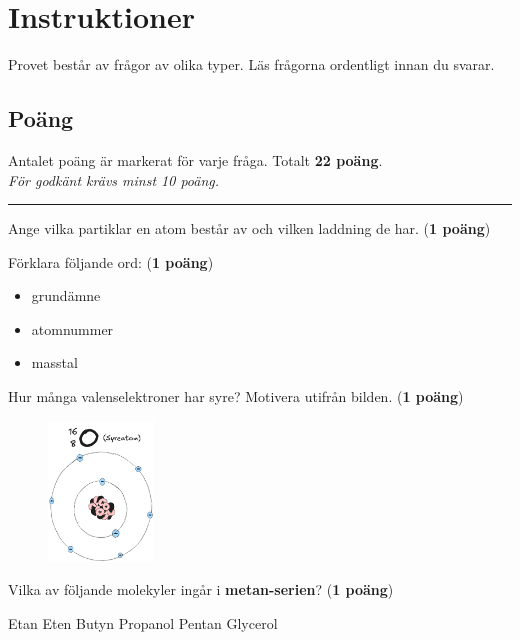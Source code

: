 \documentclass[12pt]{exam}
\begin{document}
\section*{Instruktioner}
Provet består av frågor av olika typer. Läs frågorna ordentligt innan du svarar.

\subsection*{Poäng}
Antalet poäng är markerat för varje fråga. Totalt \textbf{22 poäng}.\\ \textit{För godkänt krävs minst 10 poäng.}

\vspace{5mm}
\hrule

\begin{questions}

\question Ange vilka partiklar en atom består av och vilken laddning de har. (\textbf{1 poäng})
\vspace{20mm}

\question Förklara följande ord: (\textbf{1 poäng})
\begin{itemize}
  \item grundämne
  \item atomnummer
  \item masstal
\end{itemize}
\vspace{5mm}

\question Hur många valenselektroner har syre? Motivera utifrån bilden. (\textbf{1 poäng})

\begin{figure}[h]
  \centering
  \includegraphics[width=0.25\textwidth]{syre-atom.png}
\end{figure}
\break

\question Vilka av följande molekyler ingår i \textbf{metan-serien}? (\textbf{1 poäng})
\begin{checkboxes}
  \choice Etan
  \choice Eten
  \choice Butyn
  \choice Propanol
  \choice Pentan
  \choice Glycerol
\end{checkboxes}
\vspace{5mm}


\end{questions}
\end{document}
